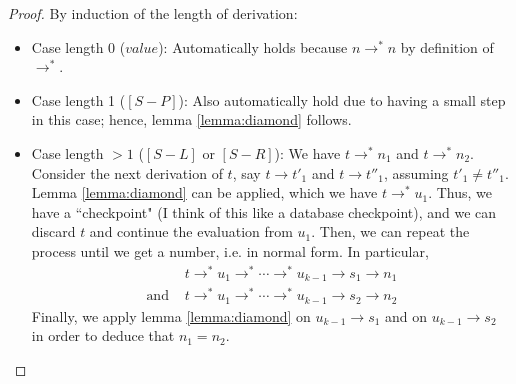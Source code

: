\documentclass[12pt]{article}
\begin{document}
\begin{proof}
By induction of the length of derivation:
\begin{itemize}
\item
Case length 0 ($value$):
Automatically holds because $n \rightarrow^* n$ by definition of $\rightarrow^*$.
\item
Case length 1 ($[S-P]$):
Also automatically hold due to having a small step in this case; hence, lemma \ref{lemma:diamond} follows.
\item
Case length $> 1$ ($[S-L]$ or $[S-R]$):
We have $t \rightarrow^* n_1$ and $t \rightarrow^* n_2$.
Consider the next derivation of $t$, say $t \rightarrow t'_1$ and $t \rightarrow t''_1$, assuming $t'_1 \neq t''_1$.
Lemma \ref{lemma:diamond} can be applied, which we have $t \rightarrow^* u_1$.
Thus, we have a ``checkpoint" (I think of this like a database checkpoint), and we can discard $t$ and continue the evaluation from $u_1$.
Then, we can repeat the process until we get a number, i.e. in normal form.
In particular,
\begin{align}
& t \rightarrow^* u_1 \rightarrow^* \cdots \rightarrow^* u_{k-1} \rightarrow s_1 \rightarrow n_1 \\
\text{and } & t \rightarrow^* u_1 \rightarrow^* \cdots \rightarrow^* u_{k-1} \rightarrow s_2 \rightarrow n_2
\end{align}
Finally, we apply lemma \ref{lemma:diamond} on $u_{k-1} \rightarrow s_1$ and on $u_{k-1} \rightarrow s_2$ in order to deduce that $n_1 = n_2$.
\end{itemize}
\end{proof}
\end{document}
